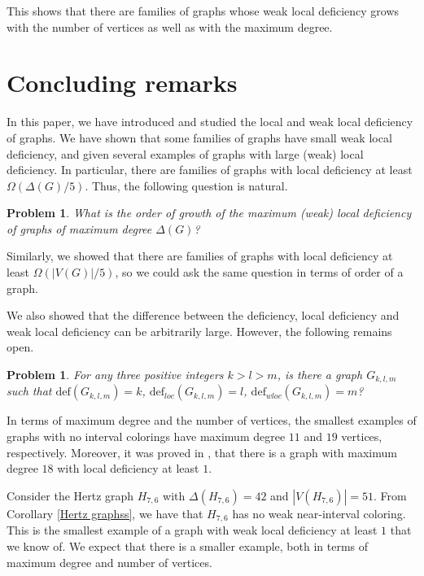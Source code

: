 \documentclass[12pt]{article}
\theoremstyle{plain}
\newtheorem{problem}[theorem]{Problem}
\theoremstyle{definition}
\newcommand{\defi}{\mathrm{def}}
\numberwithin{equation}{section}
\begin{document}
This shows that there are families of graphs whose weak local deficiency grows with the number of vertices 
as well as with the maximum degree.




\section{Concluding remarks}

In this paper, we have introduced and studied the local and weak local deficiency of graphs.
We have shown that some families of graphs have small weak local deficiency, and given
several examples of graphs with large (weak) local deficiency.
In particular, there are families of graphs with local deficiency at least $\Omega(\Delta(G)/5)$.
Thus, the following question is natural.


\begin{problem}
	What is the order of growth of the maximum (weak) local deficiency 
	of graphs of maximum degree $\Delta(G)$?
\end{problem}

Similarly, we showed that there are families of graphs with local deficiency at least $\Omega(|V(G)|/5)$, so we could
ask the same question in terms of order of a graph.

We also showed that the difference between the deficiency, local deficiency and weak local deficiency can be
arbitrarily large. However, the following remains open.

\begin{problem}
	For any three positive integers $k >l > m$, is there a graph $G_{k,l,m}$
	such that $\defi(G_{k,l,m}) =k$,  $\defi_{loc}(G_{k,l,m}) = l$,
	$\defi_{wloc}(G_{k,l,m}) = m$?
\end{problem}

\bigskip

 In terms of maximum degree and the number of vertices, the smallest examples 
of graphs with no interval colorings have maximum degree $11$ and $19$ vertices, respectively.
Moreover, it was proved in \cite{CasselgrenPetrosyan}, that there is a graph with maximum degree $18$ with local deficiency at least $1$.

Consider the Hertz graph $H_{7,6}$ with $\Delta(H_{7,6})=42$ and 
$|V(H_{7,6})|=51$. From Corollary \ref{Hertz graphss}, we have that $H_{7,6}$ has no weak near-interval coloring.
This is the smallest example of a graph with weak local deficiency at least $1$ that we know of. 
We expect that there is a smaller example,
both in terms of maximum degree and number of vertices.
\end{document}
